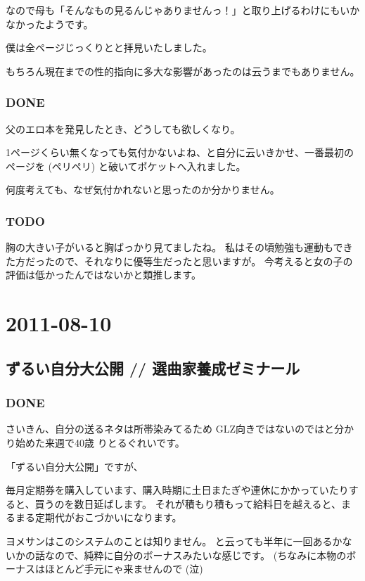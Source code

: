 \documentclass[11pt]{article}
\begin{document}
なので母も「そんなもの見るんじゃありませんっ！」と取り上げるわけにもいかなかったようです。

僕は全ページじっくりとと拝見いたしました。

もちろん現在までの性的指向に多大な影響があったのは云うまでもありません。
\subsubsection{\textbf{DONE}}
\label{sec-83_1_3}

父のエロ本を発見したとき、どうしても欲しくなり。

1ページくらい無くなっても気付かないよね、と自分に云いきかせ、一番最初のページを (ペリペリ) と破いてポケットへ入れました。

何度考えても、なぜ気付かれないと思ったのか分かりません。
\subsubsection{\textbf{TODO}}
\label{sec-83_1_4}

胸の大きい子がいると胸ばっかり見てましたね。
私はその頃勉強も運動もできた方だったので、それなりに優等生だったと思いますが。
今考えると女の子の評価は低かったんではないかと類推します。
\section{2011-08-10}
\label{sec-84}
\subsection{ずるい自分大公開 // 選曲家養成ゼミナール}
\label{sec-84_1}
\subsubsection{\textbf{DONE}}
\label{sec-84_1_1}

さいきん、自分の送るネタは所帯染みてるため GLZ向きではないのではと分かり始めた来週で40歳 りとるぐれいです。

「ずるい自分大公開」ですが、

毎月定期券を購入しています、購入時期に土日またぎや連休にかかっていたりすると、買うのを数日延ばします。
それが積もり積もって給料日を越えると、まるまる定期代がおこづかいになります。

ヨメサンはこのシステムのことは知りません。
と云っても半年に一回あるかないかの話なので、純粋に自分のボーナスみたいな感じです。
(ちなみに本物のボーナスはほとんど手元にゃ来ませんので (泣)
\end{document}

